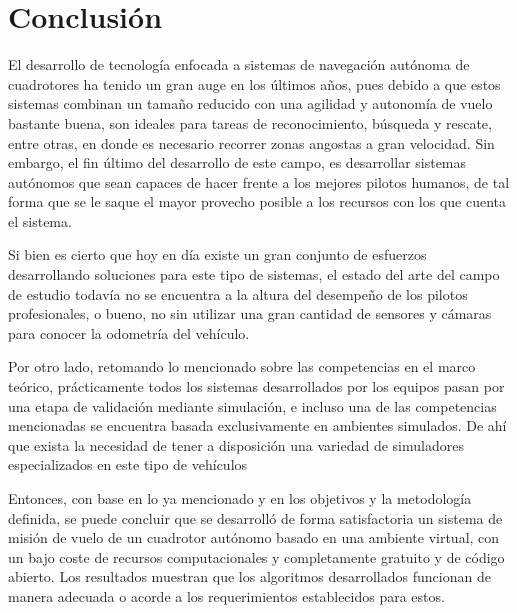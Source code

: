 \chapter{Conclusión}

El desarrollo de tecnología enfocada a sistemas de navegación autónoma de cuadrotores ha tenido un gran auge en los últimos años, pues debido a que estos sistemas combinan un tamaño reducido con una agilidad y autonomía de vuelo bastante buena, son ideales para tareas de reconocimiento, búsqueda y rescate, entre otras, en donde es necesario recorrer zonas angostas a gran velocidad. Sin embargo, el fin último del desarrollo de este campo, es desarrollar sistemas autónomos que sean capaces de hacer frente a los mejores pilotos humanos, de tal forma que se le saque el mayor provecho posible a los recursos con los que cuenta el sistema.

Si bien es cierto que hoy en día existe un gran conjunto de esfuerzos desarrollando soluciones para este tipo de sistemas, el estado del arte del campo de estudio todavía no se encuentra a la altura del desempeño de los pilotos profesionales, o bueno, no sin utilizar una gran cantidad de sensores y cámaras para conocer la odometría del vehículo.  

Por otro lado, retomando lo mencionado sobre las competencias en el marco teórico, prácticamente todos los sistemas desarrollados por los equipos pasan por una etapa de validación mediante simulación, e incluso una de las competencias mencionadas se encuentra basada exclusivamente en ambientes simulados. De ahí que exista la necesidad de tener a disposición una variedad de simuladores especializados en este tipo de vehículos

Entonces, con base en lo ya mencionado y en los objetivos y la metodología definida, se puede concluir que se desarrolló de forma satisfactoria un sistema de misión de vuelo de un cuadrotor autónomo basado en una ambiente virtual, con un bajo coste de recursos computacionales y  completamente gratuito y de código abierto. Los resultados muestran que los algoritmos desarrollados funcionan de manera adecuada o acorde a los requerimientos establecidos para estos.

